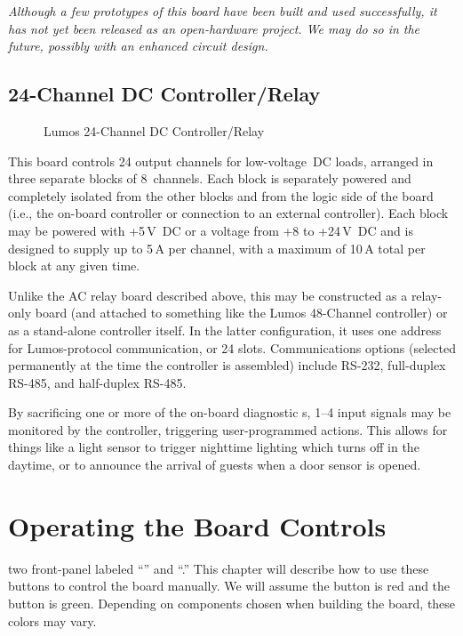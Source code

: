 \documentclass[letterpaper,twoside,onecolumn,openright,final]{memoir}
\begin{document}
\emph{Although a few prototypes of this board have been built and used successfully, it has not yet been
released as an open-hardware project.  We may do so in the future, possibly with an enhanced circuit
design.}
\section{24-Channel DC Controller/Relay}
\begin{figure}
  \begin{center}
  \end{center}
  \caption{Lumos 24-Channel DC Controller/Relay}
\end{figure}
This board controls 24 output channels for low-voltage~DC loads, arranged in three separate blocks 
of 8~channels.  Each block is separately powered and completely isolated from the other blocks and 
from the logic side of the board (i.e., the on-board controller or connection to an external
controller).  Each block may be powered with +5\,V~DC or a voltage from +8 to +24\,V~DC and
is designed to supply up to 5\,A per channel, with a maximum of 10\,A total per block at any 
given time.

Unlike the AC relay board described above, this may be constructed as a relay-only board (and attached
to something like the Lumos 48-Channel controller) or as a stand-alone controller itself.  In the latter
configuration, it uses one address for Lumos-protocol communication, or 24  slots.
Communications options (selected permanently at the time the controller is assembled) include
RS-232, full-duplex RS-485, and half-duplex RS-485.

By sacrificing one or more of the on-board diagnostic s, 1--4 input signals may be 
monitored by the controller, triggering user-programmed actions.  This allows for things like
a light sensor to trigger nighttime lighting which turns off in the daytime, or to announce the
arrival of guests when a door sensor is opened.


\chapter{Operating the Board Controls}
 two front-panel  labeled ``'' and ``.''
This chapter will describe how to use these buttons to control the board manually.  We will assume the
 button is red and the  button is green.  Depending on components chosen when building the
board, these colors may vary.
\end{document}
